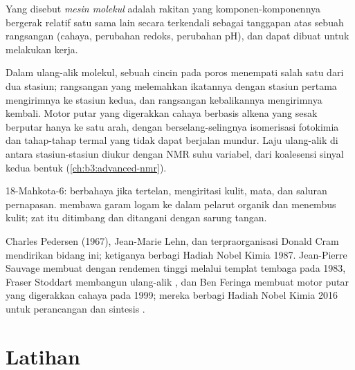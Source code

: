 \begin{definition}\label{def:b3:supramolecular:machine}
Yang disebut \emph{mesin molekul} adalah rakitan yang
komponen-komponennya bergerak relatif satu sama lain secara terkendali sebagai tanggapan atas
sebuah rangsangan (cahaya, perubahan redoks, perubahan pH), dan dapat dibuat untuk melakukan kerja.
\end{definition}

Dalam ulang-alik molekul, sebuah cincin pada poros  menempati salah satu dari dua stasiun;
rangsangan yang melemahkan ikatannya dengan stasiun pertama mengirimnya ke stasiun kedua, dan
rangsangan kebalikannya mengirimnya kembali. Motor putar yang digerakkan cahaya berbasis
alkena yang sesak berputar hanya ke satu arah, dengan berselang-selingnya isomerisasi
fotokimia dan tahap-tahap termal yang tidak dapat berjalan mundur. Laju
ulang-alik di antara stasiun-stasiun diukur dengan NMR suhu variabel, dari
koalesensi sinyal kedua bentuk (\cref{ch:b3:advanced-nmr}).

\begin{safety}{}
18-Mahkota-6: berbahaya jika tertelan, mengiritasi kulit, mata, dan saluran pernapasan.
 membawa garam logam ke dalam pelarut organik dan menembus kulit; zat itu
ditimbang dan ditangani dengan sarung tangan.
\end{safety}

\begin{history}
 Charles Pedersen (1967),  Jean-Marie Lehn, dan  terpraorganisasi Donald
Cram mendirikan bidang ini; ketiganya berbagi Hadiah Nobel Kimia
1987. Jean-Pierre Sauvage membuat  dengan rendemen tinggi melalui
templat tembaga pada 1983, Fraser Stoddart membangun ulang-alik , dan Ben
Feringa membuat motor putar yang digerakkan cahaya pada 1999; mereka berbagi Hadiah Nobel Kimia 2016
untuk perancangan dan sintesis .
\end{history}

\section{Latihan}

